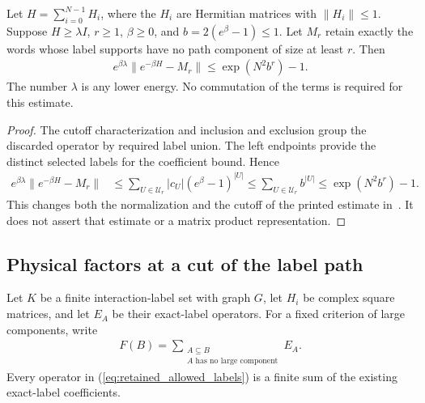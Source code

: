 \begin{lemma}
    \label{thm:normalized_cluster_label_tail}
    \leanok

    Let $H=\sum_{i=0}^{N-1}H_i$, where the $H_i$ are Hermitian matrices
    with $\|H_i\|\leq1$. Suppose $H\geq\lambda I$, $r\geq1$,
    $\beta\geq0$, and $b=2(e^\beta-1)\leq1$.
    Let $M_r$ retain exactly the words whose label supports have no
    path component of size at least $r$. Then
    \begin{align}
        e^{\beta\lambda}\|e^{-\beta H}-M_r\|
        \leq\exp(N^2b^r)-1.
        \label{eq:normalized_cluster_label_tail}
    \end{align}
    The number $\lambda$ is any lower energy. No commutation of the terms
    is required for this estimate.
\end{lemma}
\begin{proof}\leanok
    The cutoff characterization and inclusion and exclusion group the
    discarded operator by required label union.
    The left endpoints provide the distinct selected labels for the
    coefficient bound. Hence
    \begin{align}
        e^{\beta\lambda}\|e^{-\beta H}-M_r\|
        &\leq\sum_{U\in\mathcal U_r}|c_U|(e^\beta-1)^{|U|}
         \leq\sum_{U\in\mathcal U_r}b^{|U|}
         \leq\exp(N^2b^r)-1.
        \label{eq:normalized_cluster_label_tail_proof}
    \end{align}
    This changes both the normalization and the cutoff of the printed
    estimate in~\cite[lines 1270--1291 and 1935--1968]{Arad2016RigorousRG}.
    It does not assert that estimate or a matrix product representation.
\end{proof}


\subsection{Physical factors at a cut of the label path}

Let $K$ be a finite interaction-label set with graph $G$, let $H_i$ be
complex square matrices, and let $E_A$ be their exact-label operators.
For a fixed criterion of large components, write
\begin{align}
    F(B)=\sum_{\substack{A\subseteq B\\
                    A\text{ has no large component}}}E_A.
    \label{eq:retained_allowed_labels}
\end{align}
Every operator in (\ref{eq:retained_allowed_labels}) is a finite sum of
the existing exact-label coefficients.

